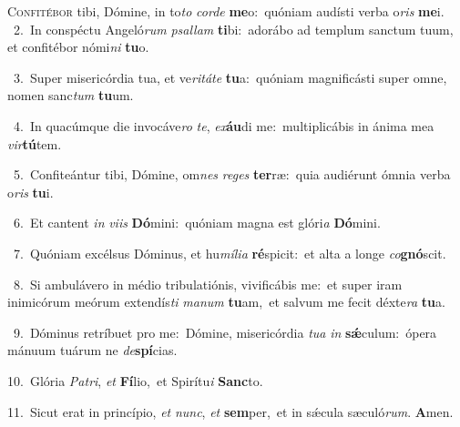 \lettrine{\initial\textcolor{\initialcolor}{C}}{onfitébor} tibi, Dómine, in to\textit{to} \textit{cor}\-\textit{de} \textbf{me}\-o:~\star quóniam audísti verba o\textit{ris} \textbf{me}\-i.\\
{\numbfont\textcolor{\numbcolor}{~2.}}~In conspéctu Angeló\textit{rum} \textit{psal}\-\textit{lam} \textbf{ti}\-bi:~\star adorábo ad templum sanctum tuum, et confitébor nómi\textit{ni} \textbf{tu}\-o.\par
{\numbfont\textcolor{\numbcolor}{~3.}}~Super misericórdia tua, et ve\-\textit{ri}\-\textit{tá}\textit{te} \textbf{tu}\-a:~\star quóniam magnificásti super omne, nomen sanc\textit{tum} \textbf{tu}\-um.\par
{\numbfont\textcolor{\numbcolor}{~4.}}~In quacúmque die invocáve\textit{ro} \textit{te}\-, \textit{ex}\-\textbf{áu}di me:~\star multiplicábis in ánima mea \textit{vir}\-\textbf{tú}tem.\par
{\numbfont\textcolor{\numbcolor}{~5.}}~Confiteántur tibi, Dómine, om\textit{nes} \textit{re}\-\textit{ges} \textbf{ter}\-ræ:~\star quia audiérunt ómnia verba o\textit{ris} \textbf{tu}\-i.\par
{\numbfont\textcolor{\numbcolor}{~6.}}~Et cantent \textit{in} \textit{vi}\-\textit{is} \textbf{Dó}\-mini:~\star quóniam magna est glóri\textit{a} \textbf{Dó}\-mini.\par
{\numbfont\textcolor{\numbcolor}{~7.}}~Quóniam excélsus Dóminus, et hu\-\textit{mí}\-\textit{li}\textit{a} \textbf{ré}\-spicit:~\star et alta a longe \textit{co}\-\textbf{gnó}scit.\par
{\numbfont\textcolor{\numbcolor}{~8.}}~Si ambulávero in médio tribulatiónis, vivificábis me:~\dagger et super iram inimicórum meórum extendís\textit{ti} \textit{ma}\-\textit{num} \textbf{tu}\-am,~\star et salvum me fecit déxte\textit{ra} \textbf{tu}\-a.\par
{\numbfont\textcolor{\numbcolor}{~9.}}~Dóminus retríbuet pro me:~\dagger Dómine, misericórdia \textit{tu}\-\textit{a} \textit{in} \textbf{sǽ}\-culum:~\star ópera mánuum tuárum ne \textit{de}\-\textbf{spí}cias.\par
{\numbfont\textcolor{\numbcolor}{10.}}~Glória \textit{Pa}\-\textit{tri}, \textit{et} \textbf{Fí}\-lio,~\star et Spirítu\textit{i} \textbf{Sanc}\-to.\par
{\numbfont\textcolor{\numbcolor}{11.}}~Sicut erat in princípio, \textit{et} \textit{nunc}\-, \textit{et} \textbf{sem}\-per,~\star et in sǽcula sæculó\-\textit{rum}\-. \textbf{A}\-men.\par
